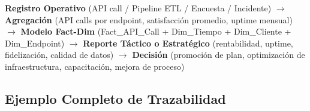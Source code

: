 ﻿\documentclass[11pt, letterpaper]{article}
\begin{document}
\begin{center}

\begin{minipage}{0.95\linewidth}

\textbf{Registro Operativo} (API call / Pipeline ETL / Encuesta / Incidente) $\rightarrow$ \textbf{Agregación} (API calls por endpoint, satisfacción promedio, uptime mensual) $\rightarrow$ \textbf{Modelo Fact-Dim} (Fact\_API\_Call + Dim\_Tiempo + Dim\_Cliente + Dim\_Endpoint) $\rightarrow$ \textbf{Reporte Táctico o Estratégico} (rentabilidad, uptime, fidelización, calidad de datos) $\rightarrow$ \textbf{Decisión} (promoción de plan, optimización de infraestructura, capacitación, mejora de proceso)

\end{minipage}

\end{center}




\subsection{Ejemplo Completo de Trazabilidad}
\end{document}
